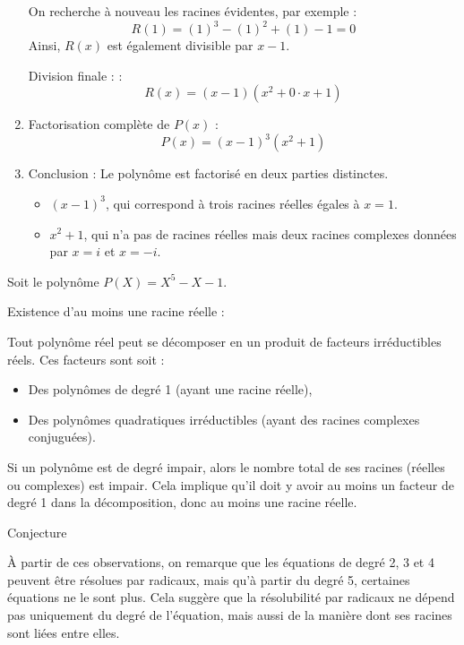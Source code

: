 \documentclass[10pt,a4paper]{article}
\begin{document}
\begin{enumerate}
    On recherche à nouveau les racines évidentes, par exemple :
    $$
    R(1) = (1)^3-(1)^2+(1)-1 = 0
    $$
    Ainsi, $ R(x) $ est également divisible par $ x-1 $.

    Division finale : :
    $$
    R(x) = (x-1)(x^2+0\cdot x+1)
    $$

    \item Factorisation complète de $ P(x) $ :
    $$
    P(x) = (x - 1)^3(x^2 + 1)
    $$

    \item Conclusion : Le polynôme est factorisé en deux parties distinctes.
    \begin{itemize}
        \item $ (x-1)^3 $, qui correspond à trois racines réelles égales à $ x=1 $.
        \item $ x^2+1 $, qui n'a pas de racines réelles mais deux racines complexes données par
        $ x = i $ et $ x = -i $.
    \end{itemize}
\end{enumerate}

\q Soit le polynôme \( P(X) = X^5 - X - 1 \).

Existence d'au moins une racine réelle :

Tout polynôme réel peut se décomposer en un produit de facteurs irréductibles réels. Ces
facteurs sont soit :
\begin{itemize}
    \item Des polynômes de degré 1 (ayant une racine réelle),
    \item Des polynômes quadratiques irréductibles (ayant des racines complexes conjuguées).
\end{itemize}
Si un polynôme est de degré impair, alors le nombre total de ses racines (réelles ou complexes)
est impair. Cela implique qu'il doit y avoir au moins un facteur de degré 1 dans la
décomposition, donc au moins une racine réelle.

\q Conjecture

À partir de ces observations, on remarque que les équations de degré 2, 3 et 4 peuvent être résolues
par radicaux, mais qu'à partir du degré 5, certaines équations ne le sont plus. Cela suggère que la
résolubilité par radicaux ne dépend pas uniquement du degré de l'équation, mais aussi de la manière
dont ses racines sont liées entre elles.
\end{document}
